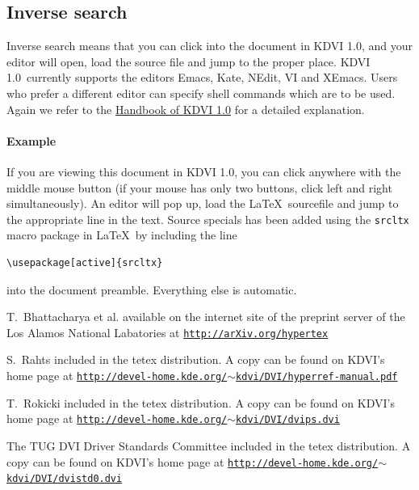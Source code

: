 \documentclass{article}
\newcommand{\KDVI}{{\sf KDVI 1.0}}
\begin{document}
\subsection{Inverse search}

Inverse search means that you can click into the document in \KDVI,
and your editor will open, load the source file and jump to the proper
place. \KDVI\ currently supports the editors Emacs, Kate, NEdit, VI
and XEmacs. Users who prefer a different editor can specify shell
commands which are to be used. Again we refer to the
\href{help:/kdvi/inverse-search.html}{Handbook of \KDVI} for a detailed explanation.

\paragraph*{Example}
If you are viewing this document in \KDVI, you can click anywhere with
the middle mouse button (if your mouse has only two buttons, click
left and right simultaneously). An editor will pop up, load the
\LaTeX\ sourcefile and jump to the appropriate line in the
text. Source specials has been added using the {\tt srcltx} macro
package in \LaTeX\ by including the line
\begin{verbatim}
\usepackage[active]{srcltx}
\end{verbatim}
into the document preamble. Everything else is automatic.


\begin{thebibliography}{CM97}

T.~Bhattacharya et al.
\newblock available on the internet site of the preprint server of the
 Los Alamos National Labatories at 
\href{http://arXiv.org/hypertex}{\small \tt http://arXiv.org/hypertex}

S.~Rahts
\newblock included in the tetex distribution. A copy can be found on KDVI's 
home page at \hfill \linebreak
\href{http://devel-home.kde.org/~kdvi/DVI/hyperref-manual.pdf}{\small \tt http://devel-home.kde.org/$\sim$kdvi/DVI/hyperref-manual.pdf}

T.~Rokicki
\newblock included in the tetex distribution. A copy can be found on KDVI's 
home page at \hfill \linebreak
\href{http://devel-home.kde.org/~kdvi/DVI/dvips.dvi}{\small \tt http://devel-home.kde.org/$\sim$kdvi/DVI/dvips.dvi}

The TUG DVI Driver Standards Committee
\newblock included in the tetex distribution. A copy can be found on KDVI's 
home page at \hfill \linebreak
\href{http://devel-home.kde.org/~kdvi/DVI/dvistd0.dvi}{\small \tt http://devel-home.kde.org/$\sim$kdvi/DVI/dvistd0.dvi}


\end{thebibliography}
\end{document}
